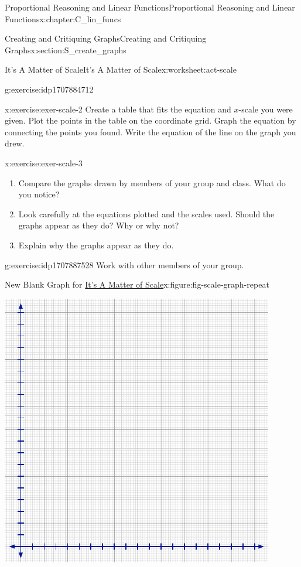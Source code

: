 \documentclass[oneside,10pt,]{book}
\numberwithin{equation}{chapter}
\begin{document}
\begin{chapterptx}{Proportional Reasoning and Linear Functions}{}{Proportional Reasoning and Linear Functions}{}{}{x:chapter:C_lin_funcs}
\begin{sectionptx}{Creating and Critiquing Graphs}{}{Creating and Critiquing Graphs}{}{}{x:section:S_create_graphs}
\begin{worksheet-subsection}{It's A Matter of Scale}{}{It's A Matter of Scale}{}{}{x:worksheet:act-scale}
\begin{divisionexercise}{1}{}{}{g:exercise:idp1707884712}
\end{divisionexercise}%
\begin{divisionexercise}{2}{}{}{x:exercise:exer-scale-2}%
Create a table that fits the equation and \(x\)-scale you were given. Plot the points in the table on the coordinate grid. Graph the equation by connecting the points you found. Write the equation of the line on the graph you drew.%
\end{divisionexercise}%
\begin{divisionexercise}{3}{}{}{x:exercise:exer-scale-3}%
\begin{enumerate}[font=\bfseries,label=(\alph*),ref=\alph*]
\item{}Compare the graphs drawn by members of your group and class. What do you notice?%
\item{}Look carefully at the equations plotted and the scales used. Should the graphs appear as they do? Why or why not?%
\item{}Explain why the graphs appear as they do.%
\end{enumerate}
\end{divisionexercise}%
\begin{divisionexercise}{4}{}{}{g:exercise:idp1707887528}%
Work with other members of your group.%
\begin{figureptx}{New Blank Graph for \hyperref[x:worksheet:act-scale]{It's A Matter of Scale}}{x:figure:fig-scale-graph-repeat}{}%
\begin{image}{0.15}{0.7}{0.15}%
\includegraphics[width=\linewidth]{external/blank-graph.pdf}

\end{image}
\end{figureptx}
\end{divisionexercise}
\end{worksheet-subsection}
\end{sectionptx}
\end{chapterptx}
\end{document}
